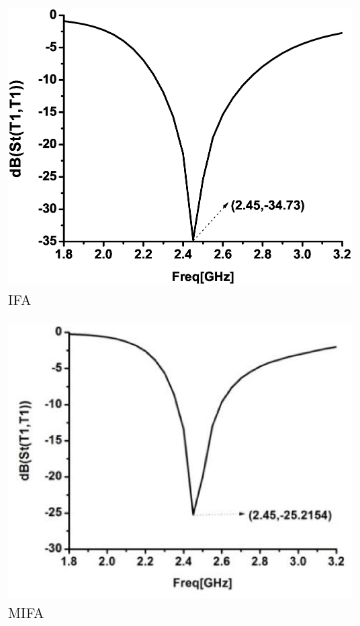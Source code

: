 \documentclass[journal]{IEEEtran}
\begin{document}
\begin{figure}[!htb]
\centering
\begin{subfigure}[b]{0.24\textwidth}
\includegraphics[width=\textwidth]{figs/2a.eps}
\caption{IFA}
\label{fig:2a}	
\end{subfigure}		
\begin{subfigure}[b]{0.24\textwidth}
\includegraphics[width=\textwidth]{figs/2b.eps}
\caption{MIFA}
\label{fig:2b}
\end{subfigure}
\begin{subfigure}[b]{0.24\textwidth}

\end{subfigure}
\end{figure}
\end{document}
